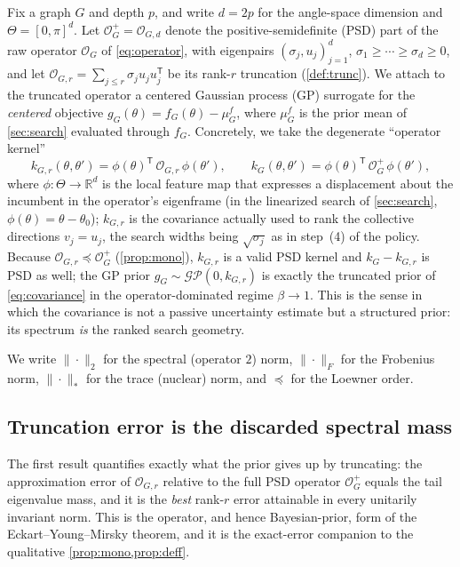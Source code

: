 \documentclass[aps,prxquantum,reprint,amsmath,amssymb,floatfix,nofootinbib,superscriptaddress,longbibliography]{revtex4-2}
\theoremstyle{remark}
\newcommand{\calO}{\mathcal{O}}
\newcommand{\bbR}{\mathbb{R}}
\begin{document}
Fix a graph \(G\) and depth \(p\), and write \(d=2p\) for the angle-space
dimension and \(\Theta=[0,\pi]^{d}\).  Let \(\calO_G^{+}=\calO_{G,d}\) denote the
positive-semidefinite (PSD) part of the raw operator \(\calO_G\) of
\cref{eq:operator}, with eigenpairs
\((\sigma_j,u_j)_{j=1}^{d}\), \(\sigma_1\ge\cdots\ge\sigma_d\ge0\), and let
\(\calO_{G,r}=\sum_{j\le r}\sigma_j u_ju_j^{\mathsf T}\) be its rank-\(r\)
truncation (\cref{def:trunc}).  We attach to the truncated operator a centered
Gaussian process (GP) surrogate for the \emph{centered} objective
\(g_G(\theta)=f_G(\theta)-\mu_G^{\!f}\), where \(\mu_G^{\!f}\) is the prior mean
of \cref{sec:search} evaluated through \(f_G\).  Concretely, we take the
degenerate ``operator kernel''
\begin{equation}
    k_{G,r}(\theta,\theta')
    =\phi(\theta)^{\mathsf T}\,\calO_{G,r}\,\phi(\theta'),
    \qquad
    k_{G}(\theta,\theta')
    =\phi(\theta)^{\mathsf T}\,\calO_G^{+}\,\phi(\theta'),
    \label{eq:operatorkernel}
\end{equation}
where \(\phi:\Theta\to\bbR^{d}\) is the local feature map that expresses a
displacement about the incumbent in the operator's eigenframe (in the linearized
search of \cref{sec:search}, \(\phi(\theta)=\theta-\theta_0\)); \(k_{G,r}\) is the
covariance actually used to rank the collective directions
\(v_j=u_j\), the search widths being \(\sqrt{\sigma_j}\) as in step~(4) of the
policy.  Because \(\calO_{G,r}\preceq\calO_G^{+}\) (\cref{prop:mono}), \(k_{G,r}\)
is a valid PSD kernel and \(k_G-k_{G,r}\) is PSD as well; the GP prior
\(g_G\sim\mathcal{GP}(0,k_{G,r})\) is exactly the truncated prior of
\cref{eq:covariance} in the operator-dominated regime \(\beta\to1\).  This is the
sense in which the covariance is not a passive uncertainty estimate but a
structured prior: its spectrum \emph{is} the ranked search geometry.

We write \(\|\cdot\|_2\) for the spectral (operator \(2\)) norm,
\(\|\cdot\|_F\) for the Frobenius norm, \(\|\cdot\|_{*}\) for the trace (nuclear)
norm, and \(\preceq\) for the Loewner order.

\subsection{Truncation error is the discarded spectral mass}
\label{sec:eym}

The first result quantifies exactly what the prior gives up by truncating: the
approximation error of \(\calO_{G,r}\) relative to the full PSD operator
\(\calO_G^{+}\) equals the tail eigenvalue mass, and it is the \emph{best}
rank-\(r\) error attainable in every unitarily invariant norm.  This is the
operator, and hence Bayesian-prior, form of the Eckart--Young--Mirsky theorem,
and it is the exact-error companion to the qualitative
\cref{prop:mono,prop:deff}.
\end{document}

